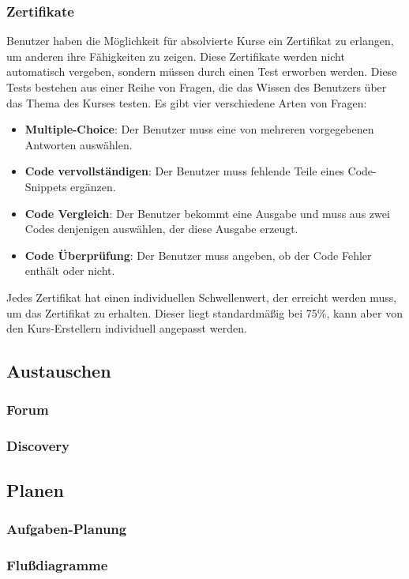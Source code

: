 \documentclass[main.tex]{subfiles}
\begin{document}
    \subsubsection{Zertifikate}
    Benutzer haben die Möglichkeit für absolvierte Kurse ein Zertifikat zu erlangen, um anderen ihre Fähigkeiten zu zeigen.
    Diese Zertifikate werden nicht automatisch vergeben, sondern müssen durch einen Test erworben werden.
    Diese Tests bestehen aus einer Reihe von Fragen, die das Wissen des Benutzers über das Thema des Kurses testen.
    Es gibt vier verschiedene Arten von Fragen:
    \begin{itemize}
        \item \textbf{Multiple-Choice}: Der Benutzer muss eine von mehreren vorgegebenen Antworten auswählen.
        \item \textbf{Code vervollständigen}: Der Benutzer muss fehlende Teile eines Code-Snippets ergänzen.
        \item \textbf{Code Vergleich}: Der Benutzer bekommt eine Ausgabe und muss aus zwei Codes denjenigen auswählen, der diese Ausgabe erzeugt.
        \item \textbf{Code Überprüfung}: Der Benutzer muss angeben, ob der Code Fehler enthält oder nicht.
    \end{itemize}
    Jedes Zertifikat hat einen individuellen Schwellenwert, der erreicht werden muss, um das Zertifikat zu erhalten.
    Dieser liegt standardmäßig bei 75\%, kann aber von den Kurs-Erstellern individuell angepasst werden.
    \subsection{Austauschen}
    \subsubsection{Forum}
    \subsubsection{Discovery}
    \subsection{Planen}
    \subsubsection{Aufgaben-Planung}
    \subsubsection{Flußdiagramme}
\end{document}
